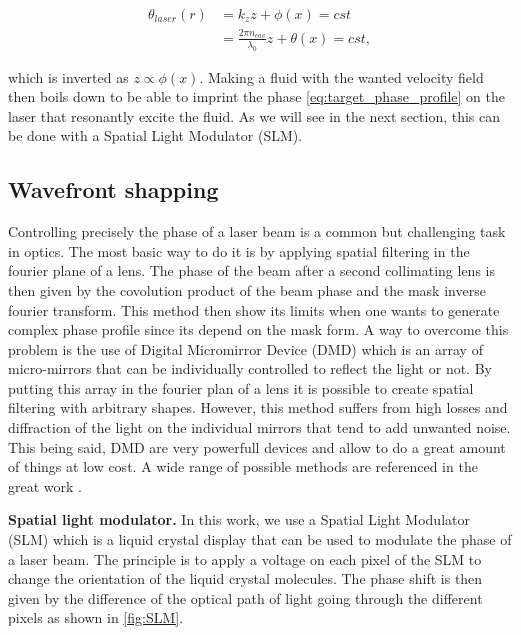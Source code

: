 \begin{equation}
    \begin{align}
    \theta_{laser}(r)&=k_zz+\phi(x)=cst \\
                      &=\frac{2\pi n_{cav} }{\lambda_0}z+\theta(x)= cst,
    \end{align}
\end{equation}

which is inverted as $z\propto \phi(x)$. Making a fluid with the wanted velocity field then boils down to be able to imprint the phase \autoref{eq:target_phase_profile} on the laser that resonantly excite the fluid. As we will see in the next section, this can be done with a Spatial Light Modulator (SLM). 

\subsection{Wavefront shapping}

Controlling precisely the phase of a laser beam is a common but challenging task in optics. The most basic way to do it is by applying spatial filtering in the fourier plane of a lens.
The phase of the beam after a second collimating lens is then given by the covolution product of the beam phase and the mask inverse fourier transform. This method then show its limits when one wants to 
generate complex phase profile since its depend on the mask form. A way to overcome this problem is the use of Digital Micromirror Device (DMD) which is an array of micro-mirrors that can be individually controlled to reflect the light or not.
By putting this array in the fourier plan of a lens it is possible to create spatial filtering with arbitrary shapes. However, this method suffers from high losses and diffraction of the light on the individual mirrors that tend to 
add unwanted noise. This being said, DMD are very powerfull devices and allow to do a great amount of things at low cost. A wide range of possible methods are referenced in the great work \cite{wavefront_shapping}. 

\bigskip

\textbf{Spatial light modulator.} In this work, we use a Spatial Light Modulator (SLM) which is a liquid crystal display that can be used to modulate the phase of a laser beam. The principle is to apply a voltage on each pixel of the SLM to change the orientation of the liquid crystal molecules. 
The phase shift is then given by the difference of the optical path of light going through the different pixels as shown in \autoref{fig:SLM}. 

